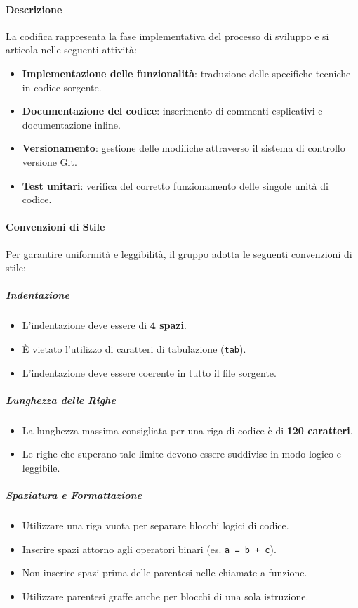 \documentclass[a4paper, 11pt, oneside]{scrartcl} %
\begin{document}
\paragraph{Descrizione}
La codifica rappresenta la fase implementativa del processo di sviluppo e si articola nelle seguenti attività:
\begin{itemize}
    \item \textbf{Implementazione delle funzionalità}: traduzione delle specifiche tecniche in codice sorgente.
    \item \textbf{Documentazione del codice}: inserimento di commenti esplicativi e documentazione inline.
    \item \textbf{Versionamento}: gestione delle modifiche attraverso il sistema di controllo versione Git{\scriptsize{}}.
    \item \textbf{Test unitari}: verifica del corretto funzionamento delle singole unità di codice.
\end{itemize}

\paragraph{Convenzioni di Stile}
Per garantire uniformità e leggibilità, il gruppo adotta le seguenti convenzioni di stile:

\subparagraph{Indentazione}
\begin{itemize}
    \item L'indentazione deve essere di \textbf{4 spazi}.
    \item È vietato l'utilizzo di caratteri di tabulazione (\texttt{tab}).
    \item L'indentazione deve essere coerente in tutto il file sorgente.
\end{itemize}

\subparagraph{Lunghezza delle Righe}
\begin{itemize}
    \item La lunghezza massima consigliata per una riga di codice è di \textbf{120 caratteri}.
    \item Le righe che superano tale limite devono essere suddivise in modo logico e leggibile.
\end{itemize}

\subparagraph{Spaziatura e Formattazione}
\begin{itemize}
    \item Utilizzare una riga vuota per separare blocchi logici di codice.
    \item Inserire spazi attorno agli operatori binari (es. \texttt{a = b + c}).
    \item Non inserire spazi prima delle parentesi nelle chiamate a funzione.
    \item Utilizzare parentesi graffe anche per blocchi di una sola istruzione.
\end{itemize}
\end{document}
